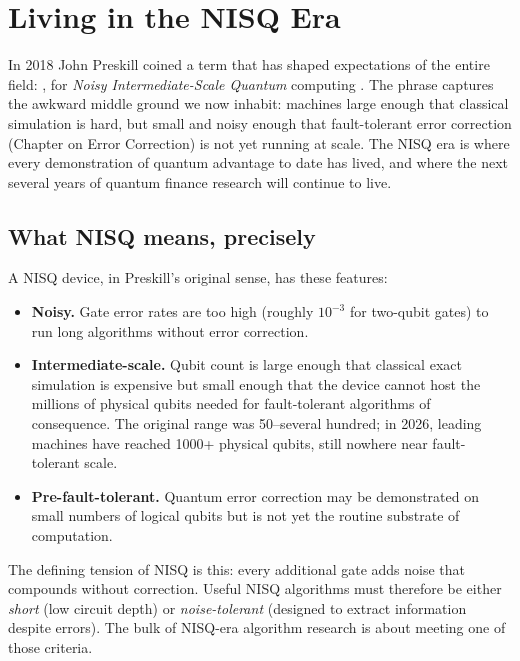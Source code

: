 \chapter{Living in the NISQ Era}


In 2018 John Preskill coined a term that has shaped expectations of the entire field: , for \emph{Noisy Intermediate-Scale Quantum} computing \citep{preskill_quantum_2018}. The phrase captures the awkward middle ground we now inhabit: machines large enough that classical simulation is hard, but small and noisy enough that fault-tolerant error correction (Chapter on Error Correction) is not yet running at scale. The NISQ era is where every demonstration of quantum advantage to date has lived, and where the next several years of quantum finance research will continue to live.

\section{What NISQ means, precisely}

A NISQ device, in Preskill's original sense, has these features:

\begin{itemize}
  \item \textbf{Noisy.} Gate error rates are too high (roughly $10^{-3}$ for two-qubit gates) to run long algorithms without error correction.
  \item \textbf{Intermediate-scale.} Qubit count is large enough that classical exact simulation is expensive but small enough that the device cannot host the millions of physical qubits needed for fault-tolerant algorithms of consequence. The original range was 50--several hundred; in 2026, leading machines have reached 1000+ physical qubits, still nowhere near fault-tolerant scale.
  \item \textbf{Pre-fault-tolerant.} Quantum error correction may be demonstrated on small numbers of logical qubits but is not yet the routine substrate of computation.
\end{itemize}

The defining tension of NISQ is this: every additional gate adds noise that compounds without correction. Useful NISQ algorithms must therefore be either \emph{short} (low circuit depth) or \emph{noise-tolerant} (designed to extract information despite errors). The bulk of NISQ-era algorithm research is about meeting one of those criteria.

